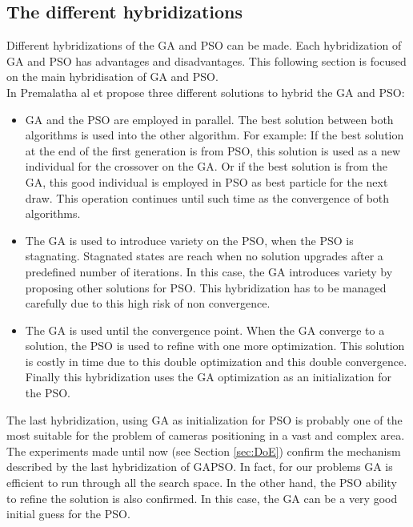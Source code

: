 \subsection{The different hybridizations }

 Different hybridizations of the GA and PSO can be made. Each hybridization of GA and PSO has advantages and disadvantages. This following section is focused on the main hybridisation of GA and PSO. \\
In Premalatha al et \cite{76*premalatha2009}  propose three different solutions to hybrid the GA and PSO: 
\begin{itemize}
\item  GA and the PSO are employed in parallel. The best solution between both algorithms is used into the other algorithm. 
For example: If the best solution at the end of the first generation is from PSO, this solution is used as a new individual for the crossover on the GA. Or if the best solution is from the GA, this good individual is employed in PSO as best particle for the next draw. This operation continues until such time as the convergence of both algorithms.   
 
\item The GA is used to introduce variety on the PSO, when the PSO is stagnating. Stagnated states are reach when no solution upgrades after a predefined number of iterations. In this case, the GA introduces variety by proposing other solutions for PSO. This hybridization has to be managed carefully due to this high risk of non convergence. 

\item The GA is used until the convergence point. When the GA converge to a solution, the PSO is used to refine with one more optimization. This solution is costly in time due to this double optimization and this double convergence. Finally this hybridization uses the GA optimization as an initialization for the PSO.\\
\end{itemize}

The last hybridization, using GA as initialization for PSO is probably one of the most suitable for the problem of cameras positioning in a vast and complex area. 
The experiments made until now (see Section \ref{sec:DoE}) confirm the mechanism described by the last hybridization of GAPSO. In fact, for our problems GA is efficient to run through all the search space. In the other hand, the PSO ability  to refine the solution is also confirmed.  
In this case, the GA can be a very good initial guess for the PSO. \\


